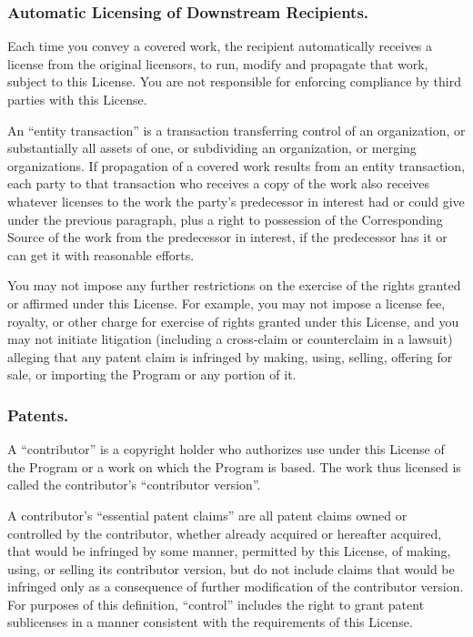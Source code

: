 \documentclass[10pt,english]{article}
\begin{document}
\subsubsection{Automatic Licensing of Downstream Recipients.\label{sub:Automatic-Licensing-of}}

Each time you convey a covered work, the recipient automatically receives
a license from the original licensors, to run, modify and propagate
that work, subject to this License. You are not responsible for enforcing
compliance by third parties with this License.

An \textquotedblleft{}entity transaction\textquotedblright{} is a
transaction transferring control of an organization, or substantially
all assets of one, or subdividing an organization, or merging organizations.
If propagation of a covered work results from an entity transaction,
each party to that transaction who receives a copy of the work also
receives whatever licenses to the work the party's predecessor in
interest had or could give under the previous paragraph, plus a right
to possession of the Corresponding Source of the work from the predecessor
in interest, if the predecessor has it or can get it with reasonable
efforts.

You may not impose any further restrictions on the exercise of the
rights granted or affirmed under this License. For example, you may
not impose a license fee, royalty, or other charge for exercise of
rights granted under this License, and you may not initiate litigation
(including a cross-claim or counterclaim in a lawsuit) alleging that
any patent claim is infringed by making, using, selling, offering
for sale, or importing the Program or any portion of it.


\subsubsection{Patents.}

A \textquotedblleft{}contributor\textquotedblright{} is a copyright
holder who authorizes use under this License of the Program or a work
on which the Program is based. The work thus licensed is called the
contributor's \textquotedblleft{}contributor version\textquotedblright{}.

A contributor's \textquotedblleft{}essential patent claims\textquotedblright{}
are all patent claims owned or controlled by the contributor, whether
already acquired or hereafter acquired, that would be infringed by
some manner, permitted by this License, of making, using, or selling
its contributor version, but do not include claims that would be infringed
only as a consequence of further modification of the contributor version.
For purposes of this definition, \textquotedblleft{}control\textquotedblright{}
includes the right to grant patent sublicenses in a manner consistent
with the requirements of this License.
\end{document}
